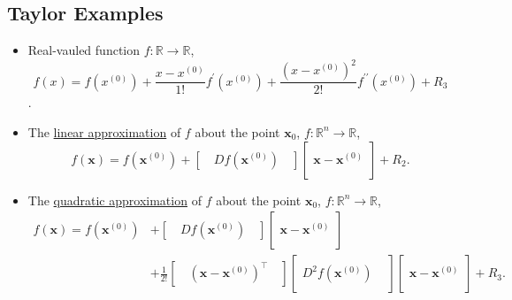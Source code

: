 \documentclass[12pt,thmsa]{article}
\begin{document}
\subsection{Taylor Examples}
\begin{itemize}
	\item Real-vauled function \(f: \mathbb{R} \rightarrow \mathbb{R}\),
	\[f(x)=f\left(x^{(0)}\right)+\frac{x-x^{(0)}}{1 !} f^{\prime}\left(x^{(0)}\right)+\frac{\left(x-x^{(0)}\right)^{2}}{2 !} f^{\prime \prime}\left(x^{(0)}\right)+R_{3}\].

	\item The \underline{linear approximation} of \(f\) about the point \(\boldsymbol{x}_{0}\), \(f: \mathbb{R}^{n} \rightarrow \mathbb{R}\),
	\[f(\boldsymbol{x})=f\left(\boldsymbol{x}^{(0)}\right)+\left[\quad D f\left(\boldsymbol{x}^{(0)}\right) \quad\right] 
	\left[\begin{aligned} \\ \boldsymbol{x}-\boldsymbol{x}^{(0)} \\  \\\end{aligned}\right]
	+R_{2}.
	\]

	\item The \underline{quadratic approximation} of \(f\) about the point \(\boldsymbol{x}_{0}\), \(f: \mathbb{R}^{n} \rightarrow \mathbb{R}\),
	\begin{align*}
	f(\boldsymbol{x}) =f\left(\boldsymbol{x}^{(0)}\right)
	& + \left[\quad D f\left(\boldsymbol{x}^{(0)}\right) \quad\right] 
	\left[\begin{aligned} \\ \boldsymbol{x}-\boldsymbol{x}^{(0)} \\  \\ \end{aligned}\right] \\
	& + \frac{1}{2 !}\left[\quad
		 \left( \boldsymbol{x}-\boldsymbol{x}^{(0)} \right)^{\top} \quad
		\right] 
		\left[\begin{aligned} &  \\  D^{2} f\left(\boldsymbol{x}^{(0)}\right) & \\ &
		\end{aligned}\right]
		\left[\begin{array}{c} \\ \boldsymbol{x} -\boldsymbol{x}^{(0)} \\ \\ \end{array}\right]
	+R_{3}.
	\end{align*}
	

\end{itemize}
\end{document}
